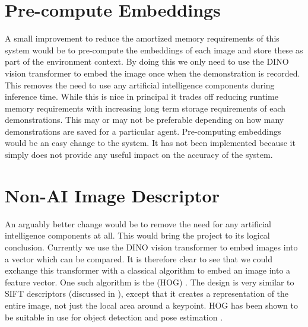 \section{Pre-compute Embeddings}
A small improvement to reduce the amortized memory requirements of this system would be to pre-compute the embeddings of each image and store these as part of the environment context. By doing this we only need to use the DINO vision transformer \cite{dino-paper} to embed the image once when the demonstration is recorded. This removes the need to use any artificial intelligence components during inference time. While this is nice in principal it trades off reducing runtime memory requirements with increasing long term storage requirements of each demonstrations. This may or may not be preferable depending on how many demonstrations are saved for a particular agent. Pre-computing embeddings would be an easy change to the system. It has not been implemented because it simply does not provide any useful impact on the accuracy of the system.

\section{Non-AI Image Descriptor}
An arguably better change would be to remove the need for any artificial intelligence components at all. This would bring the project to its logical conclusion. Currently we use the DINO vision transformer \cite{dino-paper} to embed images into a vector which can be compared. It is therefore clear to see that we could exchange this transformer with a classical algorithm to embed an image into a feature vector. One such algorithm is the  (HOG) \cite{hog-patent}. The design is very similar to SIFT descriptors (discussed in ), except that it creates a representation of the entire image, not just the local area around a keypoint. HOG has been shown to be suitable in use for object detection \cite{hog-object} and pose estimation \cite{hog-hand}.\\

